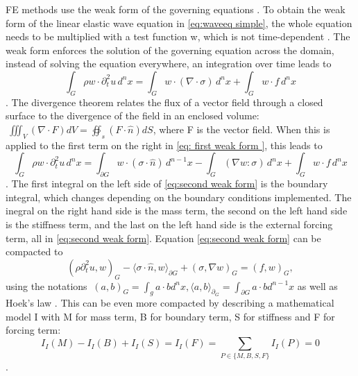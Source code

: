 \documentclass[10pt]{article}
\begin{document}
FE methods use the weak form of the governing equations \parencite{FiniteElementMethod}. To obtain the weak form of the linear elastic wave equation in \ref{eq:waveeq simple}, the whole equation needs to be multiplied with a test function w, which is not time-dependent \parencite{afanasievModularFlexibleSpectralelement2019}. The weak form enforces the solution of the governing equation across the domain, instead of solving the equation everywhere, an integration over time leads to \begin{equation}
  \int_{G} \rho w \cdot \partial_t^2u\, d^n x = \int_G w \cdot (\nabla \cdot \sigma)\, d^n x + \int_G w \cdot f\, d^n x
  \label{eq: first weak form }
\end{equation} \parencite{afanasievModularFlexibleSpectralelement2019}. The divergence theorem relates the flux of a vector field through a closed surface to the divergence of the field in an enclosed volume: $\ \iiint_V (\nabla \cdot F) dV = \oiint_s (F \cdot \hat{n}) dS $, where F is the vector field. When this is applied to the first term on the right in \ref{eq: first weak form }, this leads to \begin{equation}
  \int_{G} \rho w \cdot \partial_t^2 u\, d^n x = \int_{\partial G} w \cdot (\sigma \cdot \hat{n})\, d^{n-1}x - \int_G (\nabla w : \sigma)\, d^n x + \int_G w \cdot f\, d^n x
  \label{eq:second weak form}
\end{equation} \parencite{afanasievModularFlexibleSpectralelement2019}. The first integral on the left side of \ref{eq:second weak form} is the boundary integral, which changes depending on the boundary conditions implemented. The inegral on the right hand side is the mass term, the second on the left hand side is the stiffness term, and the last on the left hand side is the external forcing term, all in \ref{eq:second weak form}. Equation \ref{eq:second weak form} can be compacted to \begin{equation}
  (\rho\partial_t^2u,w)_G - \langle \sigma \cdot \hat{n}, w \rangle_{\partial G} + (\sigma, \nabla w)_G = (f,w)_G,
  \label{eq:compact weak form}
\end{equation} using the notations $\ (a,b)_G = \int_g a \cdot b d^nx, \langle a,b\rangle_{\partial_G} = \int_{\partial G}  a \cdot b d^{n-1}x$  as well as Hoek's law \parencite{afanasievModularFlexibleSpectralelement2019}. This can be even more compacted by describing a mathematical model I with M for mass term, B for boundary term, S for stiffness and F for forcing term: \begin{equation}
I_I(M) - I_I(B) + I_I(S) = I_I(F) = \sum_{P \in \{M,B,S,F\}} I_I(P) = 0
\label{eq:abstract weak form}
\end{equation}  \parencite{afanasievModularFlexibleSpectralelement2019}. \par 
\end{document}
